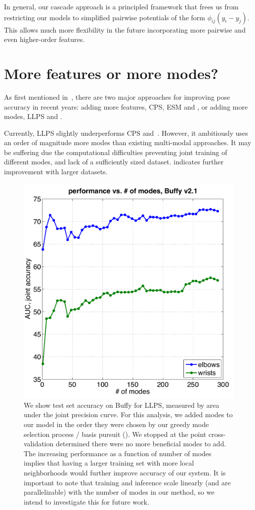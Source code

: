 In general, our cascade approach is a principled framework that frees us from 
restricting our models to simplified pairwise potentials of the form 
$\phi_{ij}(y_i - y_j)$. This allows much more flexibility in the future 
incorporating more pairwise and even higher-order features. 

\section{More features or more modes?}
As first mentioned in~, there are two major approaches for 
improving pose accuracy in recent years: adding more features, \eg CPS, ESM and 
\citet{ferrari08,eichner09,ddtran}, or adding more modes, \eg LLPS and 
\citet{dpm,wang2011,deva2011,johnson11}.  

Currently, LLPS slightly underperforms CPS and~\citet{deva2011}.  However, it 
ambitiously uses an order of magnitude more modes than existing multi-modal 
approaches.  It may be suffering due the computational difficulties preventing 
joint training of different modes, and lack of a sufficiently sized dataset.  
 indicates further improvement with larger 
datasets.

\begin{figure}[htb!]
\centering
\includegraphics[width=0.59\linewidth]{figs/llps-learning-curve.pdf}
\caption[Test accuracy versus number of local neighborhood modes in LLPS.]{
\label{fig:llps-learning-curve} We show test set accuracy on Buffy for LLPS, 
measured by area under the joint precision curve.  For this analysis, we added 
modes to our model in the order they were chosen by our greedy mode selection 
process / basis pursuit ().  We stopped at the point 
cross-validation determined there were no more beneficial modes to add. The 
increasing performance as a function of number of modes implies that having a 
larger training set with more local neighborhoods would further improve 
accuracy of our system.  It is important to note that training and inference 
scale linearly (and are parallelizable) with the number of modes in our method, 
so we intend to investigate this for future work.}
\end{figure}


